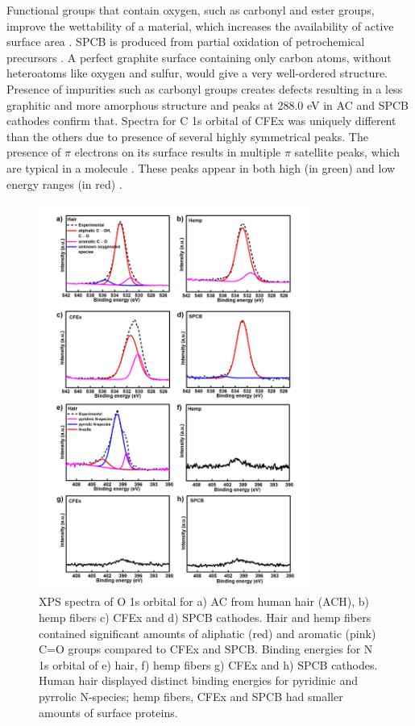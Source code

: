 Functional groups that contain oxygen, such as carbonyl and ester groups, improve the wettability of a material, which increases the availability of active surface area \cite{younesi_analysis_2015}. SPCB is produced from partial oxidation of petrochemical precursors \cite{gnanamuthu_electrochemical_2011}. A perfect graphite surface containing only carbon atoms, without heteroatoms like oxygen and sulfur, would give a very well-ordered structure. Presence of impurities such as carbonyl groups creates defects resulting in a less graphitic and more amorphous structure\cite{hao_carbonaceous_2013} and peaks at 288.0 eV in AC and SPCB cathodes confirm that. Spectra for C 1s orbital of CFEx was uniquely different than the others due to presence of several highly symmetrical peaks. The presence of $\pi$ electrons on its surface results in  multiple $\pi$ satellite peaks, which are typical in a  molecule \cite{skryleva_xps_2016}. These peaks appear in both high (in green) and low energy ranges (in red) \cite{erbahar_spectromicroscopy_2016, poirier_carbon_1993}.   

\begin{figure}[h!]
  \centering
  \includegraphics[width=0.8\textwidth]{Figures/chap5fig/XPSON}
    \caption{XPS spectra of O 1s orbital for a) AC from human hair (ACH), b) hemp fibers c) CFEx and d) SPCB cathodes. Hair and hemp fibers contained significant amounts of aliphatic (red) and aromatic (pink) C=O groups  compared to CFEx and SPCB. Binding energies for N 1s orbital of e) hair, f) hemp fibers g) CFEx and h) SPCB cathodes. Human hair displayed distinct binding energies for pyridinic and pyrrolic N-species; hemp fibers, CFEx and SPCB had smaller amounts of surface proteins.}
  \label{Figures/chap5fig:XPSON}
\end{figure}

